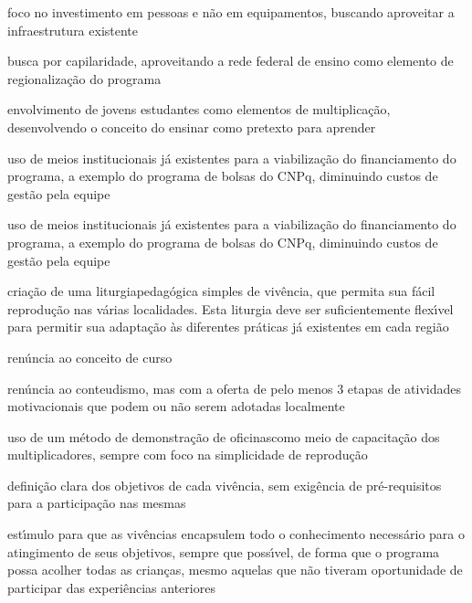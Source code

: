 \documentclass[
12pt,		%
openright,	%
twoside,  %
a4paper,			%
chapter=TITLE,		%
english,			%
french,				%
spanish,			%
brazil				%
]{USPSC-classe/USPSC}
\begin{document}
\begin{alineas}
\item \textquotedbl foco no investimento em pessoas e n\~ao em equipamentos, buscando aproveitar a infraestrutura existente\textquotedbl 
\item \textquotedbl busca por capilaridade, aproveitando a rede federal de ensino como elemento de regionaliza\c{c}\~ao do programa\textquotedbl 
\item \textquotedbl envolvimento de jovens estudantes como elementos de multiplica\c{c}\~ao, desenvolvendo o conceito do ensinar como pretexto para aprender\textquotedbl 
\item \textquotedbl uso de meios institucionais j\'a existentes para a viabiliza\c{c}\~ao do financiamento do programa, a exemplo do programa de bolsas do CNPq, diminuindo custos de gest\~ao pela equipe\textquotedbl 
\item \textquotedbl uso de meios institucionais j\'a existentes para a viabiliza\c{c}\~ao do financiamento do programa, a exemplo do programa de bolsas do CNPq, diminuindo custos de gest\~ao pela equipe\textquotedbl 
\item \textquotedbl cria\c{c}\~ao de uma \textquotedbl liturgia\textquotedbl  pedag\'ogica simples de viv\^encia, que permita sua f\'acil reprodu\c{c}\~ao nas v\'arias localidades. Esta liturgia deve ser suficientemente flex\'{\i}vel para permitir sua adapta\c{c}\~ao \`as diferentes pr\'aticas j\'a existentes em cada regi\~ao\textquotedbl 
\item \textquotedbl ren\'uncia ao conceito de curso\textquotedbl 
\item \textquotedbl ren\'uncia ao conteudismo, mas com a oferta de pelo menos 3 etapas de atividades motivacionais que podem ou n\~ao serem adotadas localmente\textquotedbl 
\item \textquotedbl uso de um m\'etodo de \textquotedbl demonstra\c{c}\~ao de oficinas\textquotedbl  como meio de capacita\c{c}\~ao dos multiplicadores, sempre com foco na
simplicidade de reprodu\c{c}\~ao\textquotedbl 
\item \textquotedbl defini\c{c}\~ao clara dos objetivos de cada viv\^encia, sem exig\^encia de pr\'e-requisitos para a participa\c{c}\~ao nas mesmas\textquotedbl 
\item \textquotedbl est\'{\i}mulo para que as viv\^encias encapsulem todo o conhecimento necess\'ario para o atingimento de seus objetivos, sempre que poss\'{\i}vel, de forma que o programa possa acolher todas as crian\c{c}as, mesmo aquelas que n\~ao tiveram oportunidade de participar das experi\^encias anteriores\textquotedbl 
\end{alineas}
\end{document}
